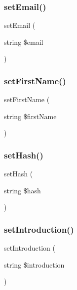 \subsubsection{\texorpdfstring{setEmail()}{setEmail()}}
{\footnotesize\ttfamily set\+Email (\begin{DoxyParamCaption}\item[{string}]{\$email }\end{DoxyParamCaption})}

\mbox{\label{class_app_1_1_entity_1_1_user_a4a951776a912492eb02ce00bb0b1e2ce}} 
\subsubsection{\texorpdfstring{setFirstName()}{setFirstName()}}
{\footnotesize\ttfamily set\+First\+Name (\begin{DoxyParamCaption}\item[{string}]{\$first\+Name }\end{DoxyParamCaption})}

\mbox{\label{class_app_1_1_entity_1_1_user_a2d4c4083b1005337912b253649056ec9}} 
\subsubsection{\texorpdfstring{setHash()}{setHash()}}
{\footnotesize\ttfamily set\+Hash (\begin{DoxyParamCaption}\item[{string}]{\$hash }\end{DoxyParamCaption})}

\mbox{\label{class_app_1_1_entity_1_1_user_a2783619c7c20ec3cdce7706c8e617324}} 
\subsubsection{\texorpdfstring{setIntroduction()}{setIntroduction()}}
{\footnotesize\ttfamily set\+Introduction (\begin{DoxyParamCaption}\item[{string}]{\$introduction }\end{DoxyParamCaption})}

